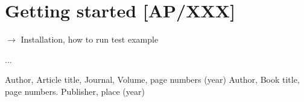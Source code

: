 \section{Getting started  {\bf [AP/XXX]}}
\label{code_init}

$\to$ Installation, how to run test example

\medskip
...



\begin{thebibliography}{}
%
%
Author, Article title, Journal, Volume, page numbers (year)
Author, Book title, page numbers. Publisher, place (year)
\end{thebibliography}



